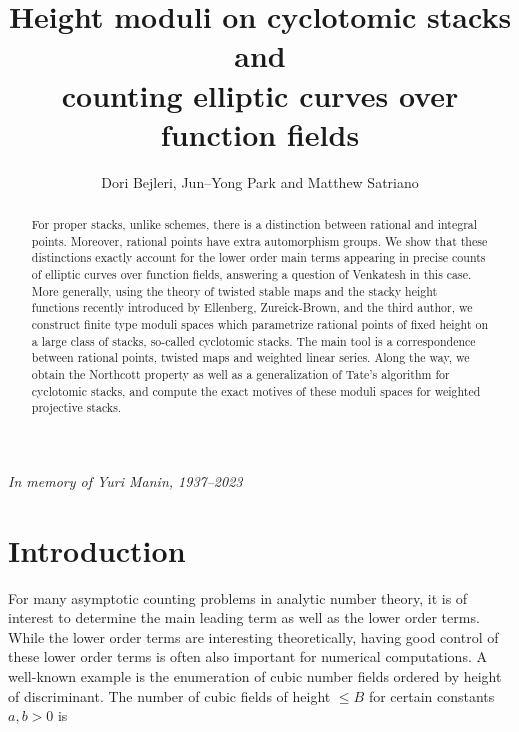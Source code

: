 \documentclass[a4paper,12pt]{amsart}
\title{Height moduli on cyclotomic stacks and \\ counting elliptic curves over function fields}
\date{}
\author{Dori Bejleri, Jun--Yong Park and Matthew Satriano}
\theoremstyle{definition}
\begin{document}
	
	\maketitle
	
	\vspace{-3ex}
	\centerline{\footnotesize{\textit{In memory of Yuri Manin, 1937--2023}}}
	
	\begin{abstract}
		For proper stacks, unlike schemes, there is a distinction between rational and integral points. Moreover, rational points have extra automorphism groups. We show that these distinctions exactly account for the lower order main terms appearing in precise counts of elliptic curves over function fields, answering a question of Venkatesh in this case. More generally, using the theory of twisted stable maps and the stacky height functions recently introduced by Ellenberg, Zureick-Brown, and the third author, we construct finite type moduli spaces which parametrize rational points of fixed height on a large class of stacks, so-called cyclotomic stacks. The main tool is a correspondence between rational points, twisted maps and weighted linear series. Along the way, we obtain the Northcott property as well as a generalization of Tate's algorithm for cyclotomic stacks, and compute the exact motives of these moduli spaces for weighted projective stacks.
		
		
		
	\end{abstract}
	
	
	
	\medskip
	\medskip
	
	
	\setcounter{tocdepth}{1}
	
	\tableofcontents
	\vspace{-3ex}
	
	\section{Introduction}
	\label{sec:intro}
	
	For many asymptotic counting problems in analytic number theory, it is of interest to determine the main leading term as well as the lower order terms. While the lower order terms are interesting theoretically, having good control of these lower order terms is often also important for numerical computations. A well-known example is the enumeration of cubic number fields ordered by height of discriminant. The number of cubic fields of height $\le B$ for certain constants $a,b > 0$ is 
	
\end{document}
